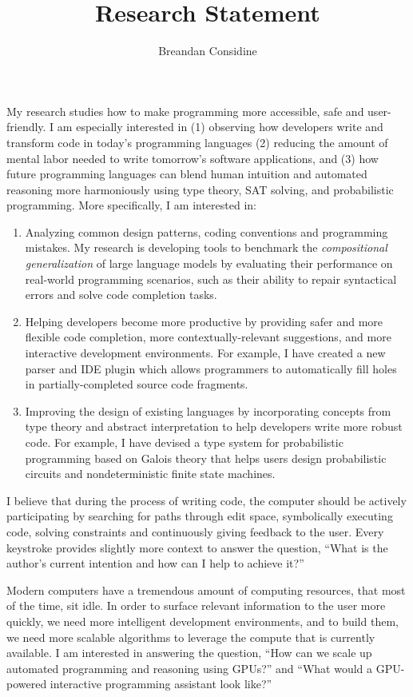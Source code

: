 \documentclass[11pt]{article}
\begin{document}
    \title{Research Statement}
    \author{Breandan Considine}
    \maketitle
    My research studies how to make programming more accessible, safe and user-friendly. I am especially interested in (1) observing how developers write and transform code in today's programming languages (2) reducing the amount of mental labor needed to write tomorrow's software applications, and (3) how future programming languages can blend human intuition and automated reasoning more harmoniously using type theory, SAT solving, and probabilistic programming. More specifically, I am interested in:

    \begin{enumerate}
        \item Analyzing common design patterns, coding conventions and programming mistakes. My research is developing tools to benchmark the \textit{compositional generalization} of large language models by evaluating their performance on real-world programming scenarios, such as their ability to repair syntactical errors and solve code completion tasks.
        \item Helping developers become more productive by providing safer and more flexible code completion, more contextually-relevant suggestions, and more interactive development environments. For example, I have created a new parser and IDE plugin which allows programmers to automatically fill holes in partially-completed source code fragments.
        \item Improving the design of existing languages by incorporating concepts from type theory and abstract interpretation to help developers write more robust code. For example, I have devised a type system for probabilistic programming based on Galois theory that helps users design probabilistic circuits and nondeterministic finite state machines.
    \end{enumerate}

    I believe that during the process of writing code, the computer should be actively participating by searching for paths through edit space, symbolically executing code, solving constraints and continuously giving feedback to the user. Every keystroke provides slightly more context to answer the question, ``What is the author's current intention and how can I help to achieve it?''

   Modern computers have a tremendous amount of computing resources, that most of the time, sit idle. In order to surface relevant information to the user more quickly, we need more intelligent development environments, and to build them, we need more scalable algorithms to leverage the compute that is currently available. I am interested in answering the question, ``How can we scale up automated programming and reasoning using GPUs?'' and ``What would a GPU-powered interactive programming assistant look like?''
\end{document}
